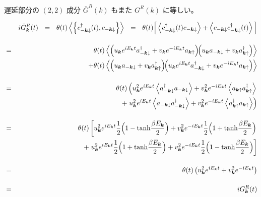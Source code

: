 \documentclass[uplatex,a4j,12pt,dvipdfmx]{jsarticle}
\begin{document}
遅延部分の $(2,2)$ 成分 $\bar{G}^{R}(k)$ もまた $G^{R}(k)$ に等しい。

\begin{eqnarray}
	&&
	i
	\bar{G}_{\bm{k}}^{R}(t)
	\ \ = \ \
	\theta(t)
	\left\langle \left\{
	c_{-\bm{k} \downarrow}^{\dagger}(t), c_{-\bm{k} \downarrow}
	\right\} \right\rangle
	\ \ = \ \
	\theta(t)
	\Big[
		\left\langle
		c_{-\bm{k} \downarrow}^{\dagger}(t) c_{-\bm{k} \downarrow}
		\right\rangle
		+
		\left\langle
		c_{-\bm{k} \downarrow} c_{-\bm{k} \downarrow}^{\dagger}(t)
		\right\rangle
		\Big]
	\nonumber \\[4mm] &=&
	\theta(t)
	\left\langle
	\left(
	u_{\bm{k}} e^{ i E_{\bm{k}} t }
	a_{-\bm{k} \downarrow}^{\dagger}
	+
	v_{\bm{k}} e^{ - i E_{\bm{k}} t }
	a_{\bm{k} \uparrow}
	\right)
	\!\!
	\left(
	u_{\bm{k}}
	a_{-\bm{k} \downarrow}
	+
	v_{\bm{k}}
	a_{\bm{k} \uparrow}^{\dagger}
	\right)
	\right\rangle
	\nonumber \\ && \hspace{5mm} +
	\theta(t)
	\left\langle
	\left(
	u_{\bm{k}}
	a_{-\bm{k} \downarrow}
	+
	v_{\bm{k}}
	a_{\bm{k} \uparrow}^{\dagger}
	\right)
	\!\!
	\left(
	u_{\bm{k}} e^{ i E_{\bm{k}} t }
	a_{-\bm{k} \downarrow}^{\dagger}
	+
	v_{\bm{k}} e^{ - i E_{\bm{k}} t }
	a_{\bm{k} \uparrow}
	\right)
	\right\rangle
	\nonumber \\[4mm]
	&=&
	\theta(t)
	\left(
	u_{\bm{k}}^{2}
	e^{ i E_{\bm{k}} t }
	\left\langle
	a_{-\bm{k} \downarrow}^{\dagger}
	a_{-\bm{k} \downarrow}
	\right\rangle
	+
	v_{\bm{k}}^{2}
	e^{ - i E_{\bm{k}} t }
	\left\langle
	a_{\bm{k} \uparrow}
	a_{\bm{k} \uparrow}^{\dagger}
	\right\rangle
	\right.
	\nonumber \\ && \hspace{5mm} +
	\left.
	u_{\bm{k}}^{2}
	e^{ i E_{\bm{k}} t }
	\left\langle
	a_{-\bm{k} \downarrow}
	a_{-\bm{k} \downarrow}^{\dagger}
	\right\rangle
	+
	v_{\bm{k}}^{2}
	e^{ - i E_{\bm{k}} t }
	\left\langle
	a_{\bm{k} \uparrow}^{\dagger}
	a_{\bm{k} \uparrow}
	\right\rangle
	\right)
	\nonumber \\[4mm]
	&=&
	\theta(t)
	\left[
		u_{\bm{k}}^{2}
		e^{ i E_{\bm{k}} t }
		\dfrac{1}{2}
		\Big( 1 - {\rm tanh}\dfrac{\beta E_{\bm{k}}}{2} \Big)
		+
		v_{\bm{k}}^{2}
		e^{ - i E_{\bm{k}} t }
		\dfrac{1}{2}
		\Big( 1 + {\rm tanh}\dfrac{\beta E_{\bm{k}}}{2} \Big)
		\right.
		\nonumber \\ && \hspace{5mm} +
		\left.
		u_{\bm{k}}^{2}
		e^{ i E_{\bm{k}} t }
		\dfrac{1}{2}
		\Big( 1 + {\rm tanh}\dfrac{\beta E_{\bm{k}}}{2} \Big)
		+
		v_{\bm{k}}^{2}
		e^{ - i E_{\bm{k}} t }
		\dfrac{1}{2}
		\Big( 1 - {\rm tanh}\dfrac{\beta E_{\bm{k}}}{2} \Big)
		\right]
	\nonumber \\[4mm] &=&
	\theta(t)
	\left(
	u_{\bm{k}}^{2}
	e^{ i E_{\bm{k}} t }
	+
	v_{\bm{k}}^{2}
	e^{ - i E_{\bm{k}} t }
	\right)
	\nonumber \\[4mm] &=&
	i
	G_{\bm{k}}^{R}(t)
\end{eqnarray}
\end{document}
